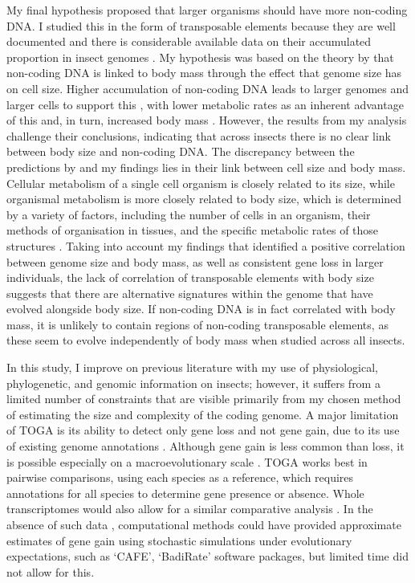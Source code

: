 \documentclass[11pt]{article}
\begin{document}
My final hypothesis proposed that larger organisms should have more non-coding DNA. I studied this in the form of transposable elements because they are well documented and there is considerable available data on their accumulated proportion in insect genomes \citep{600TEs}. My hypothesis was based on the theory by \cite{Kozlowski} that non-coding DNA is linked to body mass through the effect that genome size has on cell size. Higher accumulation of non-coding DNA leads to larger genomes and larger cells to support this \citep{cavalier-smith}, with lower metabolic rates as an inherent advantage of this and, in turn, increased body mass \citep{glazier-cell-metabolic-rate, DeLong}. However, the results from my analysis challenge their conclusions, indicating that across insects there is no clear link between body size and non-coding DNA. The discrepancy between the predictions by \cite{Kozlowski} and my findings lies in their link between cell size and body mass. Cellular metabolism of a single cell organism is closely related to its size, while organismal metabolism is more closely related to body size, which is determined by a variety of factors, including the number of cells in an organism, their methods of organisation in tissues, and the specific metabolic rates of those structures \citep{organ-metabolism}. Taking into account my findings that identified a positive correlation between genome size and body mass, as well as consistent gene loss in larger individuals, the lack of correlation of transposable elements with body size suggests that there are alternative signatures within the genome that have evolved alongside body size. If non-coding DNA is in fact correlated with body mass, it is unlikely to contain regions of non-coding transposable elements, as these seem to evolve independently of body mass when studied across all insects. 

In this study, I improve on previous literature with my use of physiological, phylogenetic, and genomic information on insects; however, it suffers from a limited number of constraints that are visible primarily from my chosen method of estimating the size and complexity of the coding genome. A major limitation of TOGA is its ability to detect only gene loss and not gene gain, due to its use of existing genome annotations \citep{TOGA}. Although gene gain is less common than loss, it is possible especially on a macroevolutionary scale \citep{gene-loss-vs-gain-2, evolution-by-gene-loss, geneloss_vs_gain}. TOGA works best in pairwise comparisons, using each species as a reference, which requires annotations for all species to determine gene presence or absence. Whole transcriptomes would also allow for a similar comparative analysis \citep{transcriptome}. In the absence of such data \citep{insectbase}, computational methods could have provided approximate estimates of gene gain using stochastic simulations under evolutionary expectations, such as `CAFE'\citep{CAFE}, `BadiRate' \citep{BadiRate} software packages, but limited time did not allow for this. 
\end{document}
